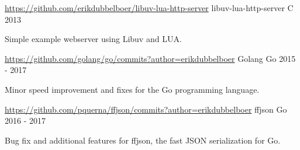\begin{cventries}
  \cventry
		{\href{https://github.com/erikdubbelboer/libuv-lua-http-server}{\textcolor{link}{https://github.com/erikdubbelboer/libuv-lua-http-server}}}
    {libuv-lua-http-server} %
    {C} %
    {2013} %
    {
      \begin{cvitems} %
				\item{Simple example webserver using Libuv and LUA.}
      \end{cvitems}
    }

  \cventry
    {\href{https://github.com/golang/go/commits?author=erikdubbelboer}{\textcolor{link}{https://github.com/golang/go/commits?author=erikdubbelboer}}} %
    {Golang} %
    {Go} %
    {2015 - 2017} %
    {
      \begin{cvitems} %
				\item{Minor speed improvement and fixes for the Go programming language.}
      \end{cvitems}
    }

  \cventry
    {\href{https://github.com/pquerna/ffjson/commits?author=erikdubbelboer}{\textcolor{link}{https://github.com/pquerna/ffjson/commits?author=erikdubbelboer}}} %
    {ffjson} %
    {Go} %
    {2016 - 2017} %
    {
      \begin{cvitems} %
				\item{Bug fix and additional features for ffjson, the fast JSON serialization for Go.}
      \end{cvitems}
    }

\end{cventries}
